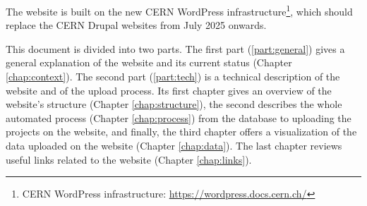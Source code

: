 \bigskip

The website is built on the new CERN WordPress infrastructure\footnote{CERN WordPress infrastructure: \href{https://wordpress.docs.cern.ch/}{https://wordpress.docs.cern.ch/}}, which should replace the CERN Drupal websites from July 2025 onwards.

This document is divided into two parts. The first part (\ref{part:general}) gives a general explanation of the website and its current status (Chapter \ref{chap:context}). The second part (\ref{part:tech}) is a technical description of the website and of the upload process. Its first chapter gives an overview of the website's structure (Chapter \ref{chap:structure}), the second describes the whole automated process (Chapter \ref{chap:process}) from the database to uploading the projects on the website, and finally, the third chapter offers a visualization of the data uploaded on the website (Chapter \ref{chap:data}). The last chapter reviews useful links related to the website (Chapter \ref{chap:links}).